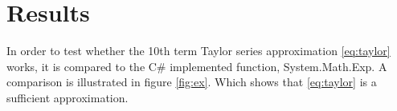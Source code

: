 \documentclass[12pt]{article}
\begin{document}
\section*{Results}

In order to test whether the 10th term Taylor series approximation \eqref{eq:taylor} works, it is compared to the C\# implemented function, System.Math.Exp. A comparison is illustrated in figure \ref{fig:ex}. Which shows that \eqref{eq:taylor} is a sufficient approximation.
\end{document}
